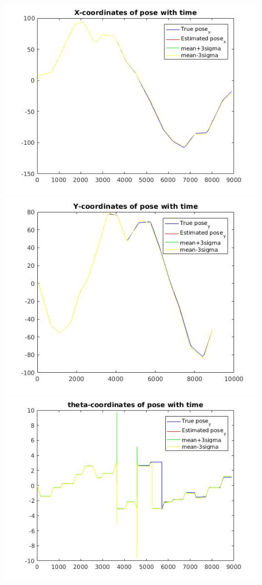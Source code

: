 \documentclass[a4paper,fleqn,11pt]{article}
\theoremstyle{mytheor}
\begin{document}
\begin{center}
\includegraphics[scale = 0.37]{../images/UKF-no-noise-xvt.jpg}
\includegraphics[scale = 0.37]{../images/UKF-no-noise-yvt.jpg}
\includegraphics[scale = 0.37]{../images/UKF-no-noise-avt.jpg}

\end{center}
\end{document}
